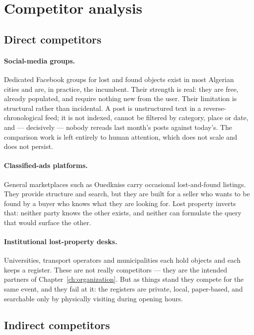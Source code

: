 \section{Competitor analysis}

\subsection{Direct competitors}

\paragraph{Social-media groups.} Dedicated Facebook groups for lost and found
objects exist in most Algerian cities and are, in practice, the incumbent. Their
strength is real: they are free, already populated, and require nothing new from
the user. Their limitation is structural rather than incidental. A post is
unstructured text in a reverse-chronological feed; it is not indexed, cannot be
filtered by category, place or date, and --- decisively --- nobody rereads last
month's posts against today's. The comparison work is left entirely to human
attention, which does not scale and does not persist.

\paragraph{Classified-ads platforms.} General marketplaces such as Ouedkniss
carry occasional lost-and-found listings. They provide structure and search, but
they are built for a seller who wants to be found by a buyer who knows what they
are looking for. Lost property inverts that: neither party knows the other
exists, and neither can formulate the query that would surface the other.

\paragraph{Institutional lost-property desks.} Universities, transport
operators and municipalities each hold objects and each keeps a register. These
are not really competitors --- they are the intended partners of
Chapter~\ref{ch:organization}. But as things stand they compete for the same
event, and they fail at it: the registers are private, local, paper-based, and
searchable only by physically visiting during opening hours.

\subsection{Indirect competitors}

